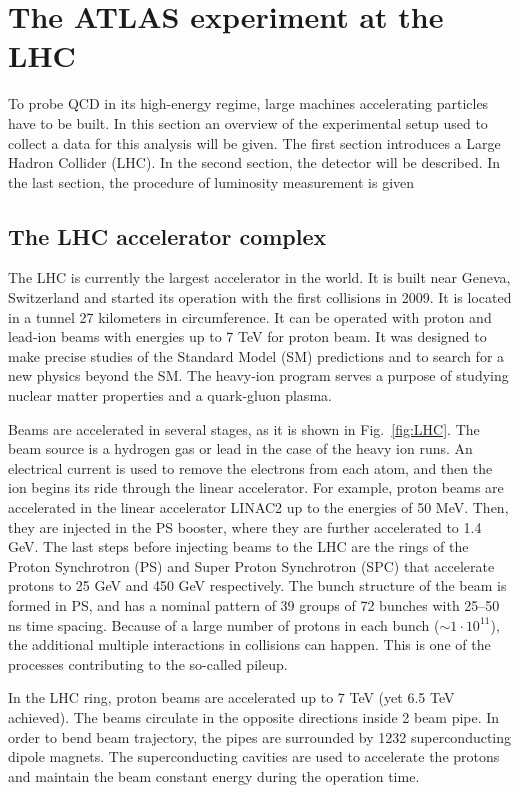 \chapter{The ATLAS experiment at the LHC}\label{chap:LHCandATLAS}
\minitoc
To probe QCD in its high-energy regime, large machines accelerating particles have to be built. In this section an overview of the experimental setup used to collect a data for this analysis will be given. The first section introduces a Large Hadron Collider (LHC). In the second section, the \atlas detector will be described. In the last section, the procedure of luminosity measurement is given

\section{The LHC accelerator complex}\label{sec:LHC}

The LHC is currently the largest accelerator in the world. It is built near Geneva, Switzerland and started its operation with the first collisions in 2009. It is located in a tunnel 27 kilometers in circumference. It can be operated with proton and lead-ion beams with energies up to 7 TeV for proton beam. It was designed to make precise studies of the Standard Model (SM) predictions and to search for a new physics beyond the SM. The heavy-ion program serves a purpose of studying nuclear matter properties and a quark-gluon plasma\cite{HILHC}.

Beams are accelerated in several stages\cite{LHCMachine}, as it is shown in Fig.~\ref{fig:LHC}. The beam source is a hydrogen gas or lead in the case of the heavy ion runs.  An electrical current is used to remove the electrons from each atom, and then the ion begins its ride through the linear accelerator. For example, proton beams are accelerated in the linear accelerator LINAC2 up to the energies of 50 MeV. Then, they are injected in the PS booster, where they are further accelerated to 1.4 GeV.  The last steps before injecting beams to the LHC are the rings of the Proton Synchrotron (PS) and Super Proton Synchrotron (SPC) that accelerate protons to 25 GeV and 450 GeV respectively. The bunch structure of the beam is formed in PS, and has a nominal pattern of 39 groups of 72 bunches with 25--50 ns time spacing. Because of a large number of protons in each bunch ($\sim 1\cdot 10^{11}$), the additional multiple interactions in collisions can happen. This is one of the processes contributing to the so-called pileup.

In the LHC ring, proton beams are accelerated up to 7 TeV (yet 6.5 TeV achieved). The beams circulate in the opposite directions inside 2 beam pipe. In order to bend beam trajectory, the pipes are surrounded by 1232 superconducting dipole magnets. The superconducting cavities are used to accelerate the protons and maintain the beam constant energy during the operation time. 

